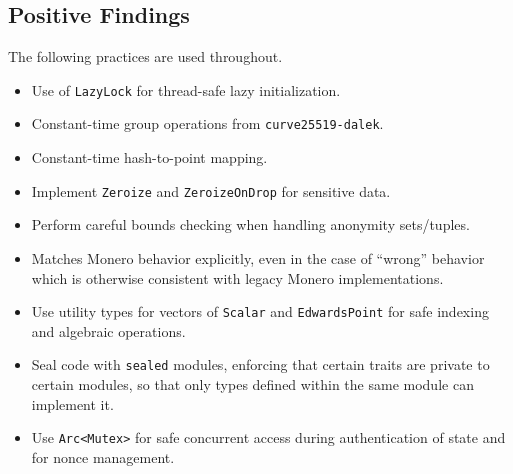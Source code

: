 \documentclass[12pt,a4paper]{article}
\begin{document}
\subsection{Positive Findings}
The following practices are used throughout.
\begin{itemize}
\item Use of \texttt{LazyLock} for thread-safe lazy initialization.  %
\item Constant-time group operations from \texttt{curve25519-dalek}.  %
\item Constant-time hash-to-point mapping.  %
\item Implement \texttt{Zeroize} and \texttt{ZeroizeOnDrop} for sensitive data.  %
\item Perform careful bounds checking when handling anonymity sets/tuples. %

\item Matches Monero behavior explicitly, even in the case of ``wrong'' behavior which is otherwise consistent with legacy Monero implementations.

\item Use utility types for vectors of \texttt{Scalar} and \texttt{EdwardsPoint} for safe indexing and algebraic operations.

\item Seal code with \texttt{sealed} modules, enforcing that certain traits are private to certain modules, so that only types defined within the same module can implement it.

\item Use \texttt{Arc<Mutex>} for safe concurrent access during authentication of state and for nonce management.


\end{itemize}
\end{document}

